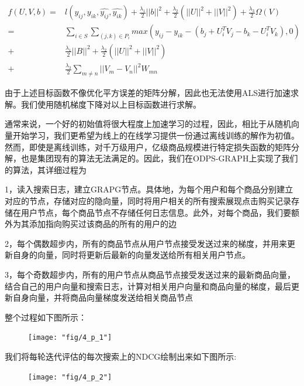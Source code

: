 \begin{equation}\label{uv4}
	\begin{split}
		f(U, V, b) = & l(y_{ij},y_{ik},\hat{y_{ij}},\hat{y_{ik}}) +  \frac{\lambda_1}{2}||b||^2 +  \frac{\lambda_2}{2}(||U||^2+||V||^2)+ \frac{\lambda_3}{2}\Omega(V) \\
      		                 = & \sum_{i \in S} \sum_{(j,k) \in P_i} max(y_{ij}-y_{ik}-(b_j + U_i^T V_j-b_k - U_i^T V_k), 0) \\
		                 + & \frac{\lambda_1}{2}||B||^2 +  \frac{\lambda_2}{2}(||U||^2+||V||^2) \\
		                 + & \frac{\lambda_3}{2}\sum_{m \ne n}||V_m-V_n||^2W_{mn}
	\end{split}
\end{equation}

由于上述目标函数不像优化平方误差的矩阵分解，因此也无法使用ALS进行加速求解。我们使用随机梯度下降对以上目标函数进行求解。

通常来说，一个好的初始值将很大程度上加速学习的过程，因此，相比于从随机向量开始学习，我们更希望为线上的在线学习提供一份通过离线训练的解作为初值。然而，即使是离线训练，对千万级用户，亿级商品规模进行特定损失函数的矩阵分解，也是集团现有的算法无法满足的。因此，我们在ODPS-GRAPH上实现了我们的算法，其详细过程为

1，读入搜索日志，建立GRAPG节点。具体地，为每个用户和每个商品分别建立对应的节点，存储对应的隐向量，同时将用户相关的所有搜索展现点击购买记录存储在用户节点，每个商品节点不存储任何日志信息。此外，对每个商品，我们要额外为其添加指向购买过该商品的所有的用户的边

2，每个偶数超步内，所有的商品节点从用户节点接受发送过来的梯度，并用来更新自身的向量，同时将更新后最新的向量发送给所有相关用户节点。

3，每个奇数超步内，所有的用户节点从商品节点接受发送过来的最新商品向量，结合自己的用户向量和搜索日志，计算对相关用户向量和商品向量的梯度，最后更新自身向量，并将商品向量梯度发送给相关商品节点

整个过程如下图所示：

\begin{figure}[h]
	\centering
	\texttt{[image: "fig/4\_p\_1"]}
\end{figure}

我们将每轮迭代评估的每次搜索上的NDCG绘制出来如下图所示:

\begin{figure}[h]
	\centering
	\texttt{[image: "fig/4\_p\_2"]}
\end{figure}
  
